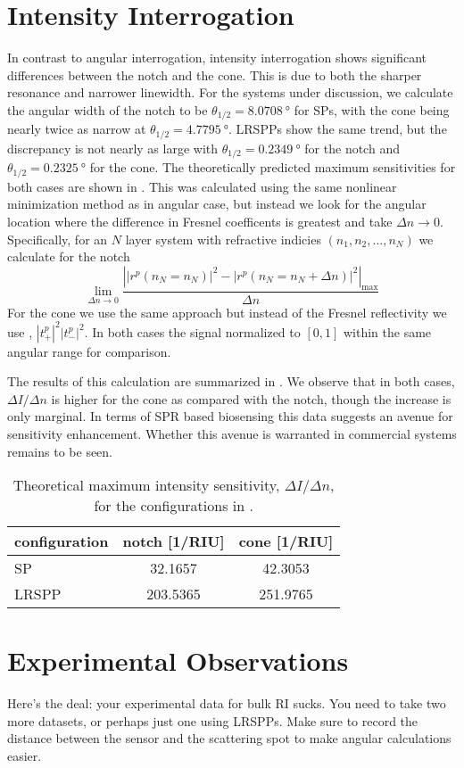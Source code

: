 \section{Intensity Interrogation}
In contrast to angular interrogation, intensity interrogation shows
significant differences between the notch and the cone.  This is due to
both the sharper resonance and narrower linewidth.  For the systems under
discussion, we calculate the angular width of the notch to be
$\theta_{1/2}=\SI{8.0708}{\degree}$ for SPs, with the cone being nearly
twice as narrow at $\theta_{1/2}=\SI{4.7795}{\degree}$.  LRSPPs show the same
trend, but the discrepancy is not nearly as large with
$\theta_{1/2}=\SI{0.2349}{\degree}$ for the notch and
$\theta_{1/2}=\SI{0.2325}{\degree}$ for the cone.  The theoretically
predicted maximum
sensitivities for both cases are shown in .  This
was calculated using the same nonlinear minimization method as in angular
case, but instead we look for the angular location where the difference in Fresnel
coefficents is greatest and take $\Delta n \to 0$.  Specifically, for an
$N$ layer system with refractive indicies $(n_1,n_2, \ldots,n_N)$ we
calculate for the notch
\begin{equation}
								\lim_{\Delta n \to 0}\frac{\left||r^p(n_N=n_N)|^2 - |r^p(n_N=n_N + \Delta n)|^2\right|_\mathrm{max}}{\Delta n}
\label{eqn:fresnelsenspertrubation}
\end{equation}
For the cone we use the same approach but instead of the Fresnel
reflectivity we use , $|t^p_+|^2|t^p_-|^2$.  In
both cases the signal normalized to $[0,1]$ within the same angular range
for comparison.

The results of this calculation are summarized in
.  We observe that in both cases, $\Delta I/\Delta
n$ is higher for the cone as compared with the notch, though the increase
is only marginal.  In terms of SPR based biosensing this data suggests an
avenue for sensitivity enhancement.  Whether this avenue is warranted in
commercial systems remains to be seen.
\begin{table}[ht]
\centering
{}
\begin{tabular}{lSS}
\toprule
{configuration} & {notch [1/RIU]} & {cone [1/RIU]} \\
\midrule
SP & 32.1657 & 42.3053 \\
LRSPP & 203.5365 & 251.9765 \\
\bottomrule
\end{tabular}
\caption{Theoretical maximum intensity sensitivity, $\Delta I/\Delta n$,
								for the configurations in . }
\label{tbl:intensitysens}
\end{table}

\section{Experimental Observations}
Here's the deal: your experimental data for bulk RI sucks.  You need to
take two more datasets, or perhaps just one using LRSPPs.  Make sure to
record the distance between the sensor and the scattering spot to make
angular calculations easier.
